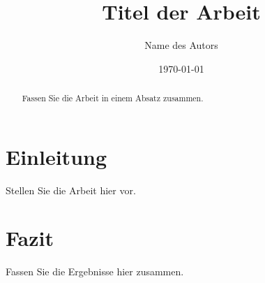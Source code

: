 \documentclass[12pt]{report}
\title{Titel der Arbeit}
\author{Name des Autors}
\date{\today}
\begin{document}
\maketitle

\begin{abstract}
Fassen Sie die Arbeit in einem Absatz zusammen.
\end{abstract}

\tableofcontents

\chapter{Einleitung}
Stellen Sie die Arbeit hier vor.

\chapter{Fazit}
Fassen Sie die Ergebnisse hier zusammen.
\end{document}
